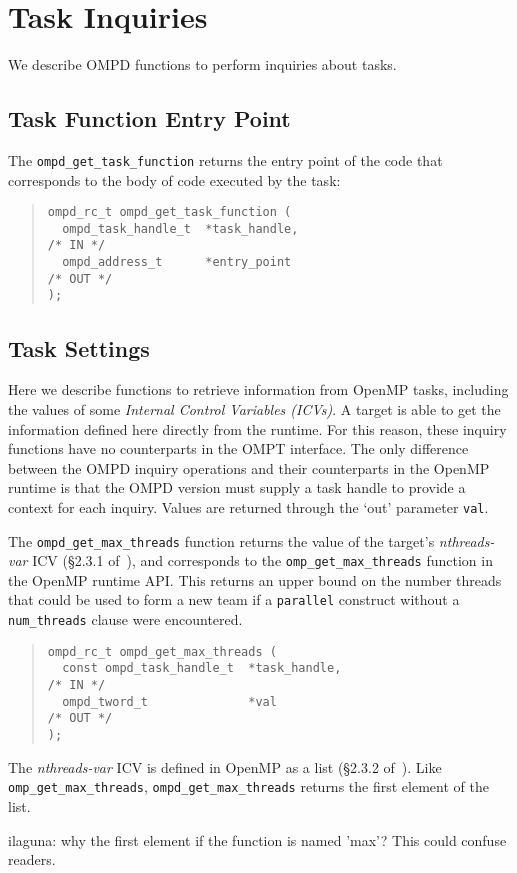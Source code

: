 \section{Task Inquiries}

We describe OMPD functions to perform inquiries about tasks.

\subsection{Task Function Entry Point}

The \verb|ompd_get_task_function| returns the entry point of the code
that corresponds to the body of code executed by the task:
\begin{quote}
\begin{lstlisting}
ompd_rc_t ompd_get_task_function (
  ompd_task_handle_t  *task_handle,                                 /* IN */
  ompd_address_t      *entry_point                                 /* OUT */
);
\end{lstlisting}
\end{quote}

\subsection{Task Settings}

Here we describe functions to retrieve information from OpenMP tasks, including 
the values of some \emph{Internal Control Variables (ICVs)}.
A target is able to get the information defined here directly from
the runtime. For this reason, these inquiry functions have no counterparts in
the OMPT interface. The only difference between the OMPD inquiry operations and 
their counterparts in the OpenMP runtime is that the OMPD version
must supply a task handle to provide a context for each inquiry.
Values are returned through the `out' parameter \texttt{val}.

The \verb|ompd_get_max_threads| function returns the value of the
target's \emph{nthreads-var} ICV (\S2.3.1 of~\cite{OpenMP}),
and corresponds to the \verb|omp_get_max_threads| function
in the OpenMP runtime API.
This returns an upper bound on the number threads that could be used
to form a new team if a \texttt{parallel} construct without a
\texttt{num\_threads} clause were encountered.
\begin{quote}
\begin{lstlisting}
ompd_rc_t ompd_get_max_threads (
  const ompd_task_handle_t  *task_handle,                           /* IN */
  ompd_tword_t              *val                                   /* OUT */
); 
\end{lstlisting}
\end{quote}
The \emph{nthreads-var} ICV is defined in OpenMP as a list
(\S2.3.2 of~\cite{OpenMP}).
Like \verb|omp_get_max_threads|, \verb|ompd_get_max_threads|
returns the first element of the list.
\begin{notes}
ilaguna: why the first element if the function is named 'max'? This could 
confuse readers.
\end{notes}

